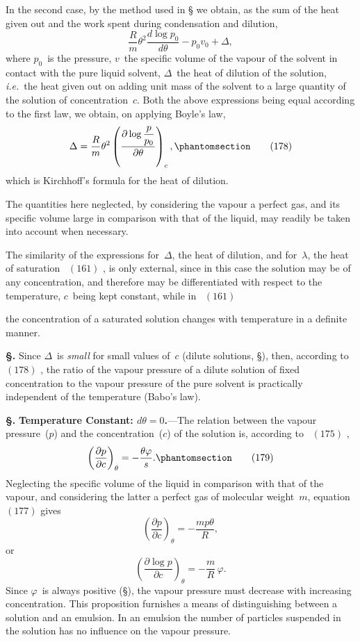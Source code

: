 \documentclass[12pt]{book}[2005/09/16]
\newcommand{\Section}[1]{
  \medskip\par\textbf{§\;#1}
  \label{section:#1}
}
\newcommand{\SecRef}[2][§\;]{\hyperref[section:#2.]{{\upshape #1#2}}}
\newcommand{\Tag}[1]{%
  \phantomsection\label{eqn:#1}\tag*{\ensuremath{#1}}%
}
\newcommand{\Eq}[1]{%
  \hyperref[eqn:#1]{\ensuremath{#1}}%
}
\newcommand{\PageSep}[1]{\ignorespaces}
\newcommand{\Topic}[1]{\textbf{#1}}
\newcommand{\ie}{\emph{i.e.}}
\newcommand{\dd}{\partial}
\begin{document}
In the second case, by the method used in \SecRef{215} we
obtain, as the sum of the heat given out and the work spent
during condensation and dilution,
\[
\frac{R}{m} \theta^{2} \frac{d \log p_{0}}{d\theta} - p_{0} v_{0} + \Delta,
\]
\PageSep{198}
where $p_{0}$~is the pressure, $v$~the specific volume of the vapour
of the solvent in contact with the pure liquid solvent, $\Delta$~the
heat of dilution of the solution, \ie\ the heat given out on
%
%
adding unit mass of the solvent to a large quantity of the
solution of concentration~$c$. Both the above expressions
being equal according to the first law, we obtain, on applying
Boyle's law,
\[
\Delta = \frac{R}{m} \theta^{2} \left(\frac{\dd \log \dfrac{p}{p_{0}}}{\dd \theta}\right)_{c},
\Tag{(178)}
\]
which is Kirchhoff's formula for the heat of dilution.
%

The quantities here neglected, by considering the vapour
a perfect gas, and its specific volume large in comparison
with that of the liquid, may readily be taken into account
when necessary.

The similarity of the expressions for~$\Delta$, the heat of
dilution, and for~$\lambda$, the heat of saturation~\Eq{(161)}, is only
external, since in this case the solution may be of any concentration,
and therefore may be differentiated with respect
to the temperature, $c$~being kept constant, while in~\Eq{(161)}
the concentration of a saturated solution changes with
temperature in a definite manner.

\Section{222.} Since $\Delta$~is \emph{small} for small values of~$c$ (dilute solutions,
\SecRef{97}), then, according to~\Eq{(178)}, the ratio of the vapour
pressure of a dilute solution of fixed concentration to the
vapour pressure of the pure solvent is practically independent
of the temperature (Babo's law).
%
%

\Section{223.} \Topic{Temperature Constant: $d\theta = 0$.}---The relation
between the vapour pressure~($p$) and the concentration~($c$)
of the solution is, according to~\Eq{(175)},
\[
\left(\frac{\dd p}{\dd c}\right)_{\theta} = -\frac{\theta\varphi}{s}.
\Tag{(179)}
\]
Neglecting the specific volume of the liquid in comparison
\PageSep{199}
%
%
with that of the vapour, and considering the latter a perfect
gas of molecular weight~$m$, equation~\Eq{(177)} gives
\[
\left(\frac{\dd p}{\dd c}\right)_{\theta} = -\frac{mp\theta}{R},
\]
or
\[
\left(\frac{\dd \log p}{\dd c}\right)_{\theta} = -\frac{m}{R}\, \varphi.
\]
Since $\varphi$~is always positive (\SecRef{217}), the vapour pressure must
decrease with increasing concentration. This proposition
furnishes a means of distinguishing between a solution
and an emulsion. In an emulsion the number of particles
suspended in the solution has no influence on the vapour
pressure.
\end{document}
